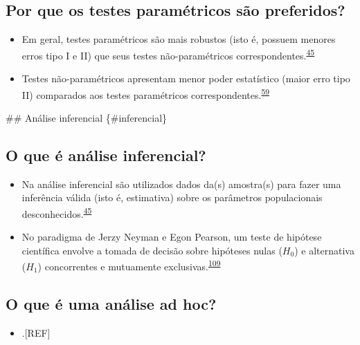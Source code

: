 \documentclass[
  a4paper,
]{book}
\providecommand{\tightlist}{%
  \setlength{\itemsep}{0pt}\setlength{\parskip}{0pt}}
\begin{document}
\hypertarget{por-que-os-testes-paramuxe9tricos-suxe3o-preferidos}{%
\subsection{Por que os testes paramétricos são preferidos?}\label{por-que-os-testes-paramuxe9tricos-suxe3o-preferidos}}

\begin{itemize}
\item
  Em geral, testes paramétricos são mais robustos (isto é, possuem menores erros tipo I e II) que seus testes não-paramétricos correspondentes.\textsuperscript{\protect\hyperlink{ref-vetter2017}{45}}
\item
  Testes não-paramétricos apresentam menor poder estatístico (maior erro tipo II) comparados aos testes paramétricos correspondentes.\textsuperscript{\protect\hyperlink{ref-Ali2016}{59}}
\end{itemize}

\#\# Análise inferencial \{\#inferencial\}

\hypertarget{o-que-uxe9-anuxe1lise-inferencial}{%
\subsection{O que é análise inferencial?}\label{o-que-uxe9-anuxe1lise-inferencial}}

\begin{itemize}
\item
  Na análise inferencial são utilizados dados da(s) amostra(s) para fazer uma inferência válida (isto é, estimativa) sobre os parâmetros populacionais desconhecidos.\textsuperscript{\protect\hyperlink{ref-vetter2017}{45}}
\item
  No paradigma de Jerzy Neyman e Egon Pearson, um teste de hipótese científica envolve a tomada de decisão sobre hipóteses nulas (\(H_{0}\)) e alternativa (\(H_{1}\)) concorrentes e mutuamente exclusivas.\textsuperscript{\protect\hyperlink{ref-Curran-Everett2009}{109}}
\end{itemize}

\hypertarget{o-que-uxe9-uma-anuxe1lise-ad-hoc}{%
\subsection{O que é uma análise ad hoc?}\label{o-que-uxe9-uma-anuxe1lise-ad-hoc}}

\begin{itemize}
\tightlist
\item
  .{[}REF{]}
\end{itemize}
\end{document}
